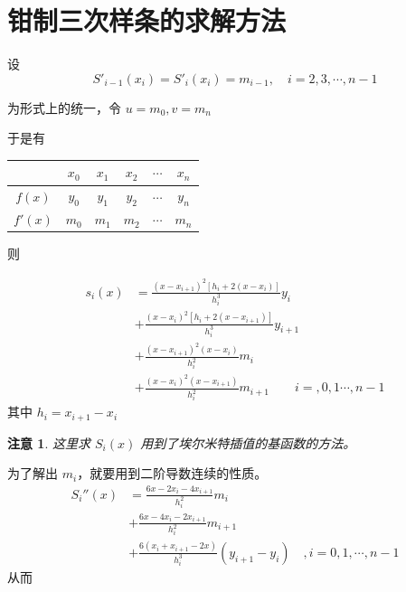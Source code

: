 \documentclass{ctexart}
\newtheorem{attention}{注意}
\numberwithin{equation}{section}
\begin{document}
\section{钳制三次样条的求解方法}
设
\begin{equation}
    S'_{i-1}(x_i) = S'_{i}(x_i)=m_{i-1},\quad i = 2,3,\cdots,n-1
\end{equation}

为形式上的统一，令 $u = m_0,v = m_n$

于是有

\begin{table}[htp]
    \begin{center}
        \begin{tabular}{cccccc}
        \toprule
        & $x_0$ & $x_1$ & $x_2$ & $\cdots$ & $x_n$ \\ 
        \midrule
        $f(x)$  & $y_0$ & $y_1$ & $y_2$ & $\cdots$ & $y_n$ \\ 
        $f'(x)$ & $m_0$ & $m_1$ & $m_2$ & $\cdots$ & $m_n$ \\ 
        \bottomrule
        \end{tabular}
    \end{center}
\end{table}

则 

\begin{equation}
\begin{aligned}
    s_i(x) 
    & = \frac{\left(x-x_{i+1}\right)^{2}\left[h_{i}+2\left(x-x_{i}\right)\right]}{h_{i}^{3}} y_{i}\\
    & +\frac{\left(x-x_{i}\right)^{2}\left[h_{i}+2\left(x-x_{i+1}\right)\right]}{h_{i}^{3}} y_{i+1} \\
    & + \frac{\left(x-x_{i+1}\right)^{2}\left(x-x_{i}\right)}{h_{i}^{2}} m_{i}\\
    & +\frac{\left(x-x_{i}\right)^{2}\left(x-x_{i+1}\right)}{h_{i}^{2}} m_{i+1}\qquad i = ,0,1\cdots,n-1
    \end{aligned}
\label{eq:8}\end{equation}
其中 $h_i = x_{i+1}-x_i$

\begin{attention}
    这里求 $S_i(x)$ 用到了埃尔米特插值的基函数的方法。
\end{attention}

为了解出 $m_i$，就要用到二阶导数连续的性质。
\begin{equation}
\begin{aligned}
    S_i''(x) &=\frac{6 x-2 x_{i}-4 x_{i+1}}{h_{i}^{2}} m_{i} \\
    &+\frac{6 x-4 x_{i}-2 x_{i+1}}{h_{i}^{2}} m_{i+1} \\
    &+\frac{6\left(x_{i}+x_{i+1}-2 x\right)}{h_{i}^{3}}\left(y_{i+1}-y_{i}\right)\quad,i = 0,1,\cdots,n-1
    \end{aligned}
\end{equation}
从而
\end{document}
